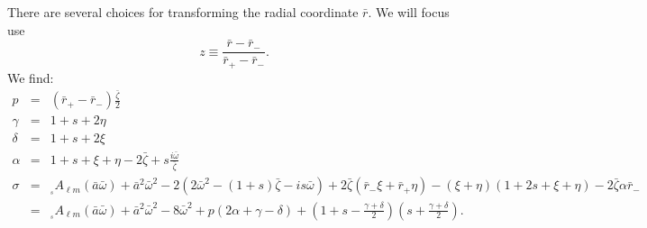 \documentclass[11pt]{article}
\newcommand{\scA}[4][]{{}_{{}_{#2}}A^{#1}_{#3}(#4)}
\begin{document}
There are several choices for transforming the radial coordinate
$\bar{r}$.  We will focus use
\begin{equation}
z \equiv \frac{\bar{r}-\bar{r}_\minus}{\bar{r}_+-\bar{r}_\minus}.
\end{equation}
We find:
\begin{eqnarray}
  p &=& (\bar{r}_+-\bar{r}_\minus)\frac{\bar\zeta}2 \\
  \gamma &=& 1+s+2\eta \\
  \delta &=& 1+s+2\xi \\
  \alpha &=& 1+s+\xi+\eta - 2\bar\zeta + s\frac{i\bar\omega}{\bar\zeta} \\
  \sigma &=& \scA{s}{\ell{m}}{\bar{a}\bar\omega} + \bar{a}^2\bar\omega^2 
   - 2\left(2\bar\omega^2-(1+s)\bar\zeta-is\bar\omega\right) 
   + 2\bar\zeta(\bar{r}_\minus\xi + \bar{r}_+\eta) - (\xi+\eta) (1+2s+\xi+\eta)
   -2\bar\zeta\alpha\bar{r}_\minus \nonumber\\
   &=& \scA{s}{\ell{m}}{\bar{a}\bar\omega} + \bar{a}^2\bar\omega^2 
   - 8\bar\omega^2 + p(2\alpha+\gamma-\delta)
   + \left(1+s-\frac{\gamma+\delta}2\right)\left(s+\frac{\gamma+\delta}2\right).
\end{eqnarray}
\end{document}
